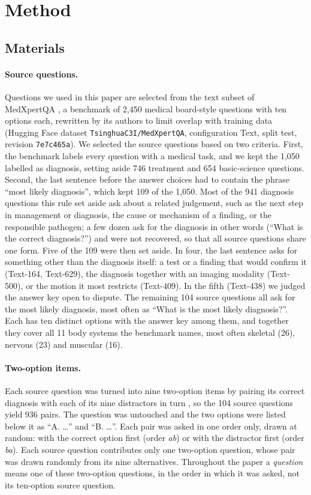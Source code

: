 \documentclass[11pt]{article}
\begin{document}
\section{Method}

\subsection{Materials}

\paragraph{Source questions.}
Questions we used in this paper are selected from the text subset of MedXpertQA \citep{zuo2025medxpertqa}, a benchmark of 2,450 medical board-style questions with ten options each, rewritten by its authors to limit overlap with training data (Hugging Face dataset \texttt{TsinghuaC3I/MedXpertQA}, configuration Text, split test, revision \texttt{7e7c465a}). We selected the source questions based on two criteria. First, the benchmark labels every question with a medical task, and we kept the 1,050 labelled as diagnosis, setting aside 746 treatment and 654 basic-science questions. Second, the last sentence before the answer choices had to contain the phrase ``most likely diagnosis'', which kept 109 of the 1,050. Most of the 941 diagnosis questions this rule set aside ask about a related judgement, such as the next step in management or diagnosis, the cause or mechanism of a finding, or the responsible pathogen; a few dozen ask for the diagnosis in other words (``What is the correct diagnosis?'') and were not recovered, so that all source questions share one form. Five of the 109 were then set aside. In four, the last sentence asks for something other than the diagnosis itself: a test or a finding that would confirm it (Text-164, Text-629), the diagnosis together with an imaging modality (Text-500), or the motion it most restricts (Text-409). In the fifth (Text-438) we judged the answer key open to dispute. The remaining 104 source questions all ask for the most likely diagnosis, most often as ``What is the most likely diagnosis?''. Each has ten distinct options with the answer key among them, and together they cover all 11 body systems the benchmark names, most often skeletal (26), nervous (23) and muscular (16).

\paragraph{Two-option items.}
Each source question was turned into nine two-option items by pairing its correct diagnosis with each of its nine distractors in turn \citep{wang2025least}, so the 104 source questions yield 936 pairs. The question was untouched and the two options were listed below it as ``A. \ldots'' and ``B. \ldots''. Each pair was asked in one order only, drawn at random: with the correct option first (order \emph{ab}) or with the distractor first (order \emph{ba}). Each source question contributes only one two-option question, whose pair was drawn randomly from its nine alternatives. Throughout the paper a \emph{question} means one of these two-option questions, in the order in which it was asked, not its ten-option source question.
\end{document}
